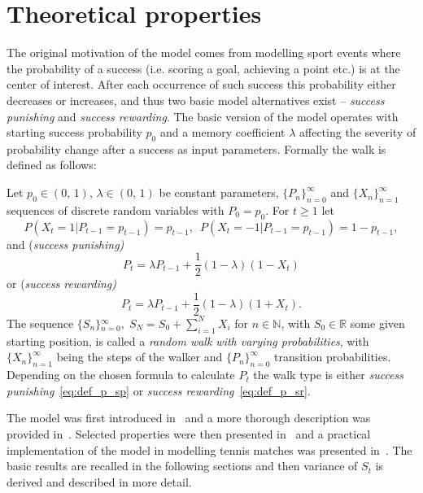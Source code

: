 \documentclass[runningheads]{CMSIM}
\begin{document}
    \section{Theoretical properties}\label{sec:theoretical-properties}

    The original motivation of the model comes from modelling sport
    events where the probability of a success (i.e. scoring a goal, achieving
    a point etc.) is at the center of interest.
    After each occurrence
    of such success this probability either decreases or increases, and
    thus two basic model alternatives exist -- \emph{success punishing} and \emph{success rewarding}.
    The basic version of the model operates
    with starting success probability $p_{0}$ and a memory coefficient
    $\lambda$ affecting the severity of probability change after a success
    as input parameters.
    Formally the walk is defined as follows:
    \begin{definition}
        \label{def:walk_definition}Let $\ensuremath{p_{0}\in(0,\,1),\,\lambda\in(0,\,1)}$
        be constant parameters, ${\{P_{n}\}}_{n=0}^{\infty}$ and ${\{X_{n}\}}_{n=1}^{\infty}$
        sequences of discrete random variables with $P_{0}=p_{0}$.
        For $t\ge1$ let
        \[
            P(X_{t}=1|P_{t-1}=p_{t-1})=p_{t-1},\,\,\,P(X_{t}=-1|P_{t-1}=p_{t-1})=1-p_{t-1},
        \]
        and (\emph{success punishing)}
        \begin{equation}
            P_{t}=\lambda P_{t-1}+\frac{1}{2}(1-\lambda)(1-X_{t})\label{eq:def_p_sp}
        \end{equation}
        or (\emph{success rewarding)
            \begin{equation}
                P_{t}=\lambda P_{t-1}+\frac{1}{2}(1-\lambda)(1+X_{t}).\label{eq:def_p_sr}
            \end{equation}
        }The sequence ${\{S_{n}\}}{}_{n=0}^{\infty},\;S_{N}=S_{0}+\sum_{i=1}^{N}X_{i}$
        for $n\in\mathbb{N}$, with $S_{0}\in\mathbb{R}$ some given starting
        position, is called a \emph{random walk with varying probabilities},
        with ${\{X_{n}\}}_{n=1}^{\infty}$ being the steps of the walker and
        ${\{P_{n}\}}_{n=0}^{\infty}$ transition probabilities.
        Depending
        on the chosen formula to calculate $P_{t}$ the walk type is either
        \emph{success punishing}~\eqref{eq:def_p_sp} or \emph{success rewarding}~\eqref{eq:def_p_sr}.
    \end{definition}

    The model was first introduced in~\cite{ja2017ddny} and a more thorough
    description was provided in~\cite{ja2019teze}.
    Selected properties
    were then presented in~\cite{ja2019apmat} and a practical implementation
    of the model in modelling tennis matches was presented in~\cite{ja2019mathsport_proc}.
    The basic results are recalled in the following sections and then
    variance of $S_{t}$ is derived and described in more detail.
\end{document}

